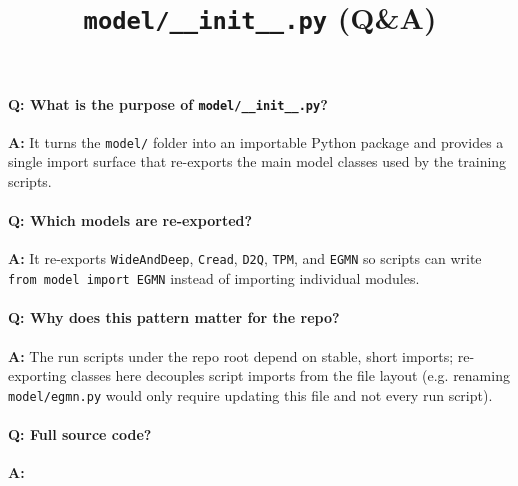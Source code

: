 \documentclass[11pt]{article}
\title{\texttt{model/\_\_init\_\_.py} (Q\&A)}
\author{}
\date{}
\begin{document}
\maketitle

\paragraph{Q: What is the purpose of \texttt{model/\_\_init\_\_.py}?}
\textbf{A:} It turns the \lstinline|model/| folder into an importable Python package and provides a single import surface that re-exports the main model classes used by the training scripts.

\paragraph{Q: Which models are re-exported?}
\textbf{A:} It re-exports \lstinline|WideAndDeep|, \lstinline|Cread|, \lstinline|D2Q|, \lstinline|TPM|, and \lstinline|EGMN| so scripts can write \lstinline|from model import EGMN| instead of importing individual modules.

\paragraph{Q: Why does this pattern matter for the repo?}
\textbf{A:} The run scripts under the repo root depend on stable, short imports; re-exporting classes here decouples script imports from the file layout (e.g. renaming \lstinline|model/egmn.py| would only require updating this file and not every run script).

\paragraph{Q: Full source code?}
\textbf{A:}

\end{document}
